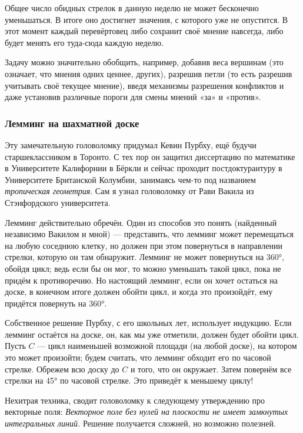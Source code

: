 Общее число обидных стрелок в данную неделю не может бесконечно уменьшаться.
В итоге оно достигнет значения, с которого уже не опустится.
В этот момент каждый перевёртовец либо сохранит своё мнение навсегда, либо будет менять его туда-сюда каждую неделю.

\medskip

Задачу можно значительно обобщить, например, добавив веса вершинам (это означает, что мнения одних ценнее, других), разрешив петли (то есть разрешив учитывать своё текущее мнение), введя механизмы разрешения конфликтов и даже установив различные пороги для смены мнений «за» и «против».

\subsubsection*{Лемминг на шахматной доске}

Эту замечательную головоломку придумал Кевин Пурбху, ещё будучи старшеклассником в Торонто.
С тех пор он защитил диссертацию по математике в Университете Калифорнии в Бёркли и
сейчас проходит постдоктурантуру в Университете Британской Колумбии,
занимаясь чем-то под названием \emph{тропическая геометрия}.
Сам я узнал головоломку от Рави Вакила из Стэнфордского университета.

Лемминг действительно обречён.
Один из способов это понять (найденный независимо Вакилом и мной) --- представить, что лемминг может перемещаться на любую соседнюю клетку, но должен при этом повернуться в направлении стрелки, которую он там обнаружит.
Лемминг не может повернуться на 360°, обойдя цикл;
ведь если бы он мог, то можно уменьшать такой цикл, пока не придём к противоречию.
Но настоящий лемминг, если он хочет остаться на доске, в конечном итоге должен обойти цикл, и когда это произойдёт, ему придётся повернуть на 360°.

Собственное решение Пурбху, с его школьных лет, использует индукцию.
Если лемминг остаётся на доске, он, как мы уже отметили, должен будет обойти цикл.
Пусть $C$ --- цикл наименьшей возможной площади (на любой доске), на котором это может произойти; будем считать, что лемминг обходит его по часовой стрелке.
Обрежем всю доску до $C$ и того, что он окружает.
Затем повернём все стрелки на 45° по часовой стрелке.
Это приведёт к меньшему циклу!

\begin{addedbytheeditors}
Нехитрая техника, сводит головоломку к следующему утверждению про векторные поля: \emph{Векторное поле без нулей на плоскости не имеет замкнутых интегральных линий.}
Решение получается сложней, но возможно полезней.\pr
\end{addedbytheeditors}
